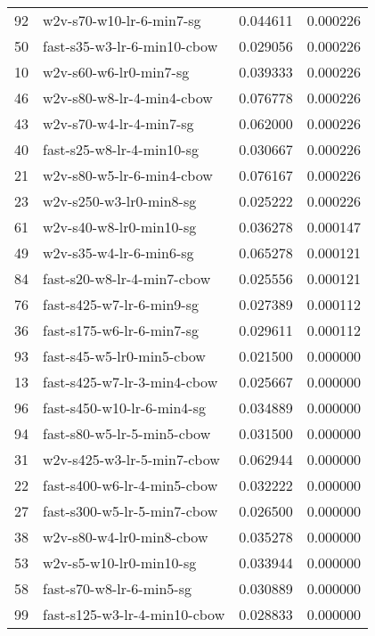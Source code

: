 {\begin{tabular}{llrr}
92 &      w2v-s70-w10-lr-6-min7-sg &  0.044611 &  0.000226 \\
50 &   fast-s35-w3-lr-6-min10-cbow &  0.029056 &  0.000226 \\
10 &        w2v-s60-w6-lr0-min7-sg &  0.039333 &  0.000226 \\
46 &     w2v-s80-w8-lr-4-min4-cbow &  0.076778 &  0.000226 \\
43 &       w2v-s70-w4-lr-4-min7-sg &  0.062000 &  0.000226 \\
40 &     fast-s25-w8-lr-4-min10-sg &  0.030667 &  0.000226 \\
21 &     w2v-s80-w5-lr-6-min4-cbow &  0.076167 &  0.000226 \\
23 &       w2v-s250-w3-lr0-min8-sg &  0.025222 &  0.000226 \\
61 &       w2v-s40-w8-lr0-min10-sg &  0.036278 &  0.000147 \\
49 &       w2v-s35-w4-lr-6-min6-sg &  0.065278 &  0.000121 \\
84 &    fast-s20-w8-lr-4-min7-cbow &  0.025556 &  0.000121 \\
76 &     fast-s425-w7-lr-6-min9-sg &  0.027389 &  0.000112 \\
36 &     fast-s175-w6-lr-6-min7-sg &  0.029611 &  0.000112 \\
93 &     fast-s45-w5-lr0-min5-cbow &  0.021500 &  0.000000 \\
13 &   fast-s425-w7-lr-3-min4-cbow &  0.025667 &  0.000000 \\
96 &    fast-s450-w10-lr-6-min4-sg &  0.034889 &  0.000000 \\
94 &    fast-s80-w5-lr-5-min5-cbow &  0.031500 &  0.000000 \\
31 &    w2v-s425-w3-lr-5-min7-cbow &  0.062944 &  0.000000 \\
22 &   fast-s400-w6-lr-4-min5-cbow &  0.032222 &  0.000000 \\
27 &   fast-s300-w5-lr-5-min7-cbow &  0.026500 &  0.000000 \\
38 &      w2v-s80-w4-lr0-min8-cbow &  0.035278 &  0.000000 \\
53 &       w2v-s5-w10-lr0-min10-sg &  0.033944 &  0.000000 \\
58 &      fast-s70-w8-lr-6-min5-sg &  0.030889 &  0.000000 \\
99 &  fast-s125-w3-lr-4-min10-cbow &  0.028833 &  0.000000 \\
\bottomrule
\end{tabular}
}
